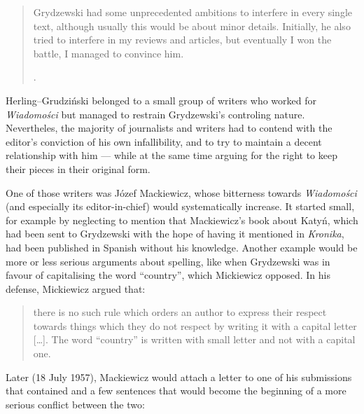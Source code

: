 \begin{paper}
\begin{quote}
Grydzewski had some
unprecedented ambitions to interfere in every single text, although
usually this would be about minor details. Initially, he also tried to
interfere in my reviews and articles, but eventually I won the battle, I
managed to convince him. 
\begin{flushright}
\citep[164]{madyda_krytyka_1995}.
\end{flushright}
\end{quote}

\noindent Herling--Grudziński
belonged to a small group of writers who worked for \emph{Wiadomości}
but managed to restrain Grydzewski's controling nature. Nevertheles, the
majority of journalists and writers had to contend with the editor's
conviction of his own infallibility, and to try to maintain a decent relationship
with him --- while at the same time arguing for the right to keep their pieces
in their original form. 

One of those writers was Józef Mackiewicz, whose bitterness towards \emph{Wiadomości} (and especially its editor-in-chief) would systematically increase. It started
small, for example by neglecting to mention that Mackiewicz's  book about Katyń, which had been sent to Grydzewski with the hope of having it
mentioned in \emph{Kronika}, had been published in Spanish without his
knowledge. Another example would be more or less serious
arguments about spelling, like when Grydzewski was in favour of capitalising the word ``country'', which
Mickiewicz opposed. In his defense, Mickiewicz argued that:

\begin{quote}

there is
no such rule which orders an author to express their respect towards
things which they do not respect by writing it with a capital letter
{[}\ldots{}{]}. The word ``country'' is written with small letter and
not with a capital one.
\begin{flushright}
\citep[92]{lewandowski_gleboki_1995} 
\end{flushright}
\end{quote}

\noindent Later (18 July 1957), Mackiewicz would attach  a letter to one of his submissions that contained 
and a few sentences that would become the beginning of a more
serious conflict between the two:


\end{paper}
